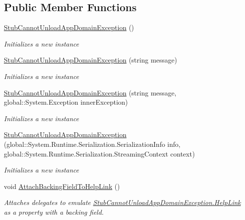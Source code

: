 \subsection*{Public Member Functions}
\begin{DoxyCompactItemize}
\item 
\hyperlink{class_system_1_1_fakes_1_1_stub_cannot_unload_app_domain_exception_a11a56ffd26baed476cd5ef9a9ffae933}{Stub\-Cannot\-Unload\-App\-Domain\-Exception} ()
\begin{DoxyCompactList}\small\item\em Initializes a new instance\end{DoxyCompactList}\item 
\hyperlink{class_system_1_1_fakes_1_1_stub_cannot_unload_app_domain_exception_a32d56cc01b4239575583cf29e32acef0}{Stub\-Cannot\-Unload\-App\-Domain\-Exception} (string message)
\begin{DoxyCompactList}\small\item\em Initializes a new instance\end{DoxyCompactList}\item 
\hyperlink{class_system_1_1_fakes_1_1_stub_cannot_unload_app_domain_exception_a919ac1bb5985f8000b7d85343883514a}{Stub\-Cannot\-Unload\-App\-Domain\-Exception} (string message, global\-::\-System.\-Exception inner\-Exception)
\begin{DoxyCompactList}\small\item\em Initializes a new instance\end{DoxyCompactList}\item 
\hyperlink{class_system_1_1_fakes_1_1_stub_cannot_unload_app_domain_exception_a7c4651c63bc7b3340dc7d01a32ed237f}{Stub\-Cannot\-Unload\-App\-Domain\-Exception} (global\-::\-System.\-Runtime.\-Serialization.\-Serialization\-Info info, global\-::\-System.\-Runtime.\-Serialization.\-Streaming\-Context context)
\begin{DoxyCompactList}\small\item\em Initializes a new instance\end{DoxyCompactList}\item 
void \hyperlink{class_system_1_1_fakes_1_1_stub_cannot_unload_app_domain_exception_a73344e759f82ed97c37d4b4b002d3092}{Attach\-Backing\-Field\-To\-Help\-Link} ()
\begin{DoxyCompactList}\small\item\em Attaches delegates to emulate \hyperlink{class_system_1_1_fakes_1_1_stub_cannot_unload_app_domain_exception_a3b82b68504a54995e185225ca84c04d7}{Stub\-Cannot\-Unload\-App\-Domain\-Exception.\-Help\-Link} as a property with a backing field.\end{DoxyCompactList}\item 

\end{DoxyCompactItemize}
